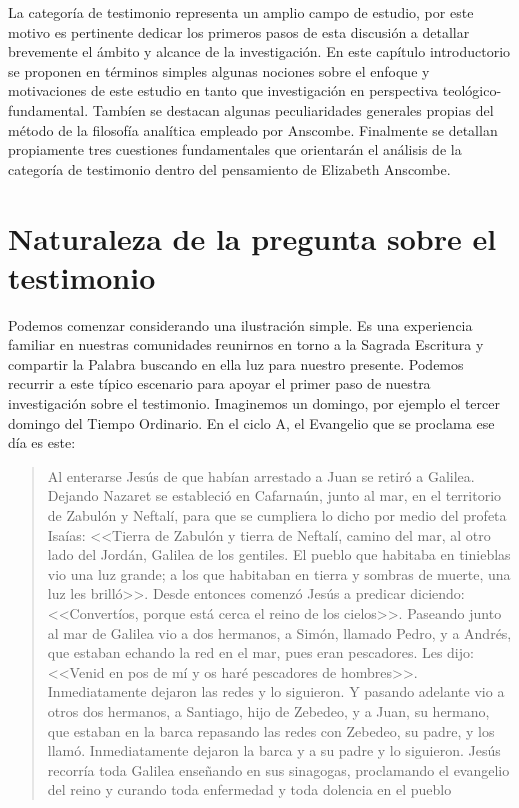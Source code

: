 La categoría de testimonio representa un amplio campo de estudio, por este motivo es pertinente dedicar los primeros pasos de esta discusión a detallar brevemente el ámbito y alcance de la investigación. En este capítulo introductorio se proponen en términos simples algunas nociones sobre el enfoque y motivaciones de este estudio en tanto que investigación en perspectiva teológico-fundamental. Tambíen se destacan algunas peculiaridades generales propias del método de la filosofía analítica empleado por Anscombe. Finalmente se detallan propiamente tres cuestiones fundamentales que orientarán el análisis de la categoría de testimonio dentro del pensamiento de Elizabeth Anscombe.

\section{Naturaleza de la pregunta sobre el testimonio}

Podemos comenzar considerando una ilustración simple. Es una experiencia familiar en nuestras comunidades reunirnos en torno a la Sagrada Escritura y compartir la Palabra buscando en ella luz para nuestro presente. Podemos recurrir a este típico escenario para apoyar el primer paso de nuestra investigación sobre el testimonio. Imaginemos un domingo, por ejemplo el tercer domingo del Tiempo Ordinario. En el ciclo A, el Evangelio que se proclama ese día es este:
\blockquote[][\,(Mt~4,12-23)]{Al enterarse Jesús de que habían arrestado a Juan se retiró a Galilea. Dejando Nazaret se estableció en Cafarnaún, junto al mar, en el territorio de Zabulón y Neftalí, para que se cumpliera lo dicho por medio del profeta Isaías: <<Tierra de Zabulón y tierra de Neftalí, camino del mar, al otro lado del Jordán, Galilea de los gentiles. El pueblo que habitaba en tinieblas vio una luz grande; a los que habitaban en tierra y sombras de muerte, una luz les brilló>>. Desde entonces comenzó Jesús a predicar diciendo: <<Convertíos, porque está cerca el reino de los cielos>>. Paseando junto al mar de Galilea vio a dos hermanos, a Simón, llamado Pedro, y a Andrés, que estaban echando la red en el mar, pues eran pescadores. Les dijo: <<Venid en pos de mí y os haré pescadores de hombres>>. Inmediatamente dejaron las redes y lo siguieron. Y pasando adelante vio a otros dos hermanos, a Santiago, hijo de Zebedeo, y a Juan, su hermano, que estaban en la barca repasando las redes con Zebedeo, su padre, y los llamó. Inmediatamente dejaron la barca y a su padre y lo siguieron. Jesús recorría toda Galilea enseñando en sus sinagogas, proclamando el evangelio del reino y curando toda enfermedad y toda dolencia en el pueblo}.

